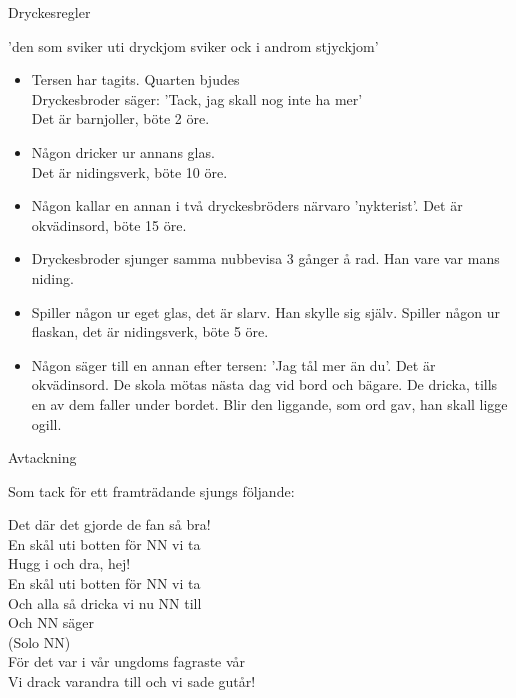 \newpage
\begin{flushleft}
{\Huge Dryckesregler\\}
\end{flushleft}
{\large
'den som sviker uti dryckjom sviker ock i androm stjyckjom'
\begin{itemize}
\item Tersen har tagits. Quarten bjudes\\ Dryckesbroder säger: 'Tack, jag 
skall nog inte ha mer'\\ Det  är barnjoller, böte 2 öre.
\item Någon dricker ur annans glas. \\Det är nidingsverk, böte 10 öre.
\item Någon kallar en annan i två dryckesbröders närvaro 'nykterist'. 
Det är okvädinsord, böte 15 öre.
\item Dryckesbroder sjunger samma nubbevisa 3 gånger å rad. Han vare var 
mans niding.
\item Spiller någon ur eget glas, det är slarv. Han skylle sig själv. 
Spiller någon ur flaskan, det är nidingsverk, böte 5 öre.
\item Någon säger till en annan efter tersen: 'Jag tål mer än du'. Det 
är okvädinsord. De skola mötas nästa dag vid bord och bägare. De 
dricka, tills en av dem faller under bordet. Blir den liggande, som ord 
gav, han skall ligge ogill.
\end{itemize}
}

\begin{flushleft}
{\Huge Avtackning\\}
\end{flushleft}
{\large
Som tack för ett framträdande sjungs följande:

\begin{flushleft}
Det där det gjorde de fan så bra!\\
En skål uti botten för NN vi ta\\
\repopen Hugg i och dra, hej! \repclose\\
En skål uti botten för NN vi ta\\
Och alla så dricka vi nu NN till\\
Och NN säger\\
(Solo NN)\\
För det var i vår ungdoms fagraste vår\\
Vi drack varandra till och vi sade gutår!\\
\end{flushleft}
}

































